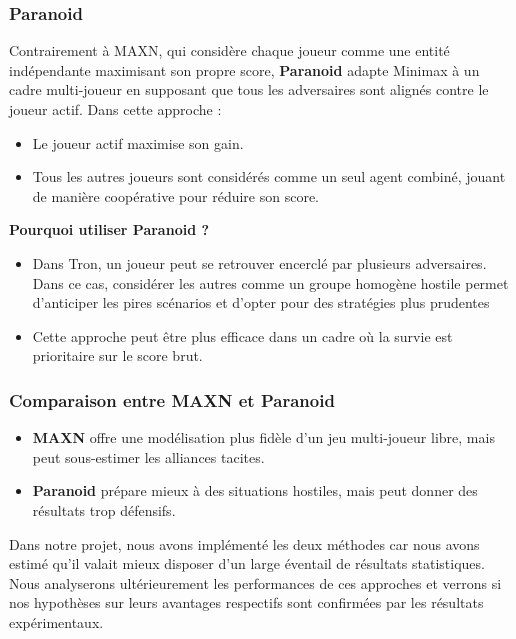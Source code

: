 \subsubsection{Paranoid}
Contrairement à MAXN, qui considère chaque joueur comme une entité indépendante maximisant son propre score, \textbf{Paranoid} adapte Minimax à un cadre multi-joueur en supposant que tous les adversaires sont alignés contre le joueur actif.
Dans cette approche :
\begin{itemize}
    \item Le joueur actif maximise son gain.
    \item Tous les autres joueurs sont considérés comme un seul agent combiné, jouant de manière coopérative pour réduire son score.
\end{itemize}
\textbf{Pourquoi utiliser Paranoid ?}
\begin{itemize}
    \item Dans Tron, un joueur peut se retrouver encerclé par plusieurs adversaires. Dans ce cas, considérer les autres comme un groupe homogène hostile permet d'anticiper les pires scénarios et d'opter pour des stratégies plus prudentes
    \item Cette approche peut être plus efficace dans un cadre où la survie est prioritaire sur le score brut.
\end{itemize}

\subsubsection{Comparaison entre MAXN et Paranoid}
\begin{itemize}
    \item \textbf{MAXN} offre une modélisation plus fidèle d'un jeu multi-joueur libre, mais peut sous-estimer les alliances tacites.
    \item \textbf{Paranoid} prépare mieux à des situations hostiles, mais peut donner des résultats trop défensifs.
\end{itemize}
Dans notre projet, nous avons implémenté les deux méthodes car nous avons estimé qu'il valait mieux disposer d'un large éventail de résultats statistiques. Nous analyserons ultérieurement les performances de ces approches et verrons si nos hypothèses sur leurs avantages respectifs sont confirmées par les résultats expérimentaux.

